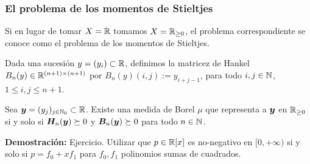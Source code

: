 \documentclass[aspectratio=169,12pt,spanish]{beamer}
\begin{document}

\begin{frame}

\frametitle{El problema de los momentos de Stieltjes}

Si en lugar de tomar $X = \mathbb{R}$ tomamos $X = \mathbb{R}_{\ge 0}$, el problema correspondiente se conoce como el problema de los momentos de Stieltjes.

Dada una sucesión $y = (y_i) \subset \mathbb{R}$, definimos la matricez de Hankel $B_n(y) \in \mathbb{R}^{(n+1) \times (n+1)}$ por
$B_n(y)(i,j) := y_{i+j-1}$, 
para todo $i, j \in \mathbb{N}$, $1 \le i,j \le n+1$.

\begin{theorem}
Sea $\bm{y} = (y_j)_{j \in \mathbb{N}_0} \subset \mathbb{R}$. Existe una medida de Borel $\mu$ que representa a $\bm{y}$ en $\mathbb{R}_{\ge 0}$ si y solo si $\bm{H}_n(\bm{y}) \succeq 0$ y $\bm{B}_n(\bm{y}) \succeq 0$ para todo $n \in \mathbb{N}$.
\label{it:stieltjes}
\end{theorem}

\textbf{Demostración:} Ejercicio. Utilizar que $p \in \mathbb{R}[x]$ es no-negativo en $[0, +\infty)$ si y solo si 
$p = f_0 + x f_1$ para $f_0, f_1$ polinomios sumas de cuadrados.
\end{frame}
\end{document}
